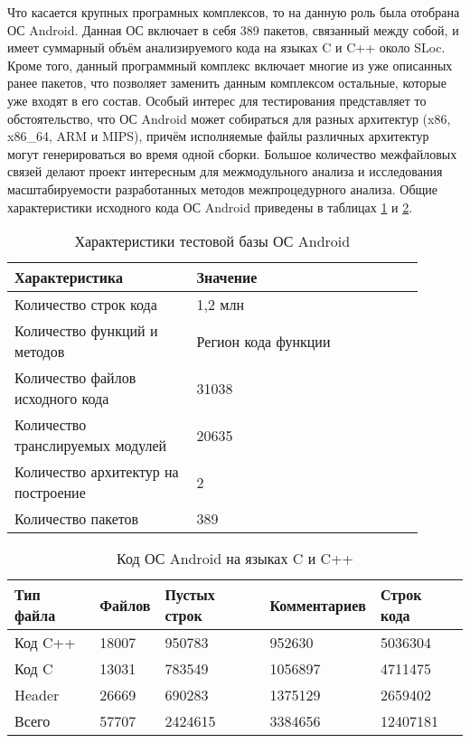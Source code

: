 Что касается крупных програмных комплексов, то на данную роль была отобрана ОС Android. Данная ОС включает в себя 389 пакетов, связанный между собой, и имеет суммарный объём анализируемого кода на языках C и C++ около  SLoc. Кроме того, данный программный комплекс включает многие из уже описанных ранее пакетов, что позволяет заменить данным комплексом остальные, которые уже входят в его состав. Особый интерес для тестирования представляет то обстоятельство, что ОС Android может собираться для разных архитектур (x86, x86\_64, ARM и MIPS), причём  исполняемые файлы различных архитектур могут генерироваться во время одной сборки. Большое количество межфайловых связей делают проект интересным для межмодульного анализа и исследования масштабируемости разработанных методов межпроцедурного анализа. Общие характеристики исходного кода ОС Android приведены в таблицах \ref{table:android-char} и \ref{table:android-code}.

\begin{table} [htbp]
  \centering
  \parbox{15cm}{\caption{Характеристики тестовой базы ОС Android}\label{table:android-char}}
  \begin{tabular}{| p{0.4\linewidth} || p{0.5\linewidth} |}
  \hline
  \hline
  Характеристика   & Значение \\
  \hline
  \hline
  Количество строк кода   & 1,2 млн \\
  \hline
  Количество функций и методов & Регион кода функции   \\
  \hline
  Количество файлов исходного кода      & 31038    \\
  \hline
  Количество транслируемых модулей  & 20635   \\
  \hline
  Количество архитектур на построение & 2   \\
  \hline
  Количество пакетов & 389 \\
  \hline
  \hline
  \end{tabular}
\end{table}

\begin{table} [htbp]
  \centering
  \parbox{15cm}{\caption{Код ОС Android на языках C и C++}\label{table:android-code}}
  \begin{tabular}{| l | l | l | l | l |}
  \hline
  \hline
  Тип файла   & Файлов   & Пустых строк   & Комментариев & Строк кода \\
  \hline
  \hline
  Код C++                  & 18007  & 950783     &    952630   &   5036304 \\
  \hline
  Код C                    & 13031  & 783549     &   1056897   &   4711475 \\
  \hline
  Header                   & 26669  & 690283     &    1375129  &   2659402 \\
  \hline
  Всего                    & 57707  & 2424615    &    3384656  &   12407181 \\
  \hline
  \hline
  \end{tabular}
\end{table}

